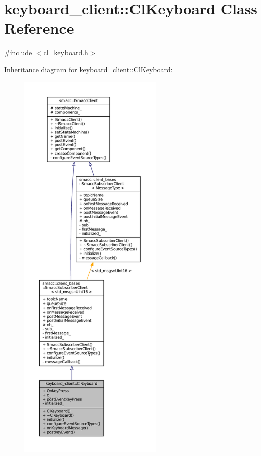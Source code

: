 \hypertarget{classkeyboard__client_1_1ClKeyboard}{}\section{keyboard\+\_\+client\+:\+:Cl\+Keyboard Class Reference}
\label{classkeyboard__client_1_1ClKeyboard}


{\ttfamily \#include $<$cl\+\_\+keyboard.\+h$>$}



Inheritance diagram for keyboard\+\_\+client\+:\+:Cl\+Keyboard\+:
\nopagebreak
\begin{figure}[H]
\begin{center}
\leavevmode
\includegraphics[height=550pt]{classkeyboard__client_1_1ClKeyboard__inherit__graph}
\end{center}
\end{figure}


